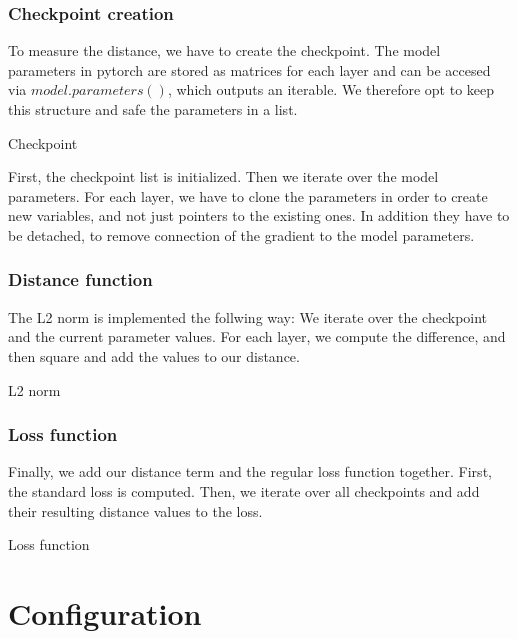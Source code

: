 \subsubsection{Checkpoint creation}
To measure the distance, we have to create the checkpoint. The model parameters
in pytorch are stored as matrices for each layer and can be accesed via
$model.parameters()$, which outputs an iterable. We therefore opt to keep this
structure and safe the parameters in a list.
\begin{algorithm}[h!]
    \caption{Checkpoint}\label{alg:Checkpoint}
    \lstset{language=Python}
    
\end{algorithm}
\newline
First, the checkpoint list is initialized. Then we iterate over the model
parameters. For each layer, we have to clone the parameters in order to create
new variables, and not just pointers to the existing ones. In addition they have
to be detached, to remove connection of the gradient to the model parameters.

\subsubsection{Distance function}
The L2 norm is implemented the follwing way: We iterate over the checkpoint and
the current parameter values. For each layer, we compute the difference, and
then square and add the values to our distance.
\begin{algorithm}[h!]
    \caption{L2 norm}\label{alg:L2Norm}
    \lstset{language=Python}
    
\end{algorithm}

\subsubsection{Loss function}
Finally, we add our distance term and the regular loss function together. First,
the standard loss is computed. Then, we iterate over all checkpoints and add
their resulting distance values to the loss.
\begin{algorithm}[h!]
    \caption{Loss function}
    \lstset{language=Python}
    
\end{algorithm}



\section{Configuration}

